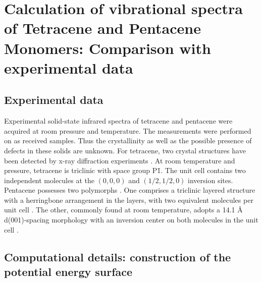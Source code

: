 \section{Calculation of vibrational spectra of Tetracene and Pentacene Monomers: Comparison with experimental data}

\subsection{Experimental data}

Experimental solid-state infrared spectra of tetracene and pentacene \cite{michaelian2012far} were acquired at room pressure and temperature. The measurements were performed on as received samples. Thus the crystallinity as well as the possible presence of defects in these solids are unknown. For tetracene, two crystal structures have been detected by x-ray diffraction experiments \cite{venuti2004phonons}. At room temperature and pressure, tetracene is triclinic \cite{campbell1962crystal} with space group P\={1}. The unit cell contains two independent molecules at the $(0,0,0)$ and $(1/2,1/2,0)$ inversion sites. Pentacene possesses two polymorphs \cite{venuti2002probing,brillante2005characterization}. One comprises a triclinic layered structure with a herringbone arrangement in the layers, with two equivalent molecules per unit cell \cite{campbell1961crystal}.  The other, commonly found at room temperature, adopts a 14.1 Å d(001)-spacing morphology with an inversion center on both molecules in the unit cell \cite{holmes1999nature,siegrist2001enhanced,mattheus2001polymorphism,mattheus2003identification,mattheus2003modeling}.

\subsection{Computational details: construction of the potential energy surface}

